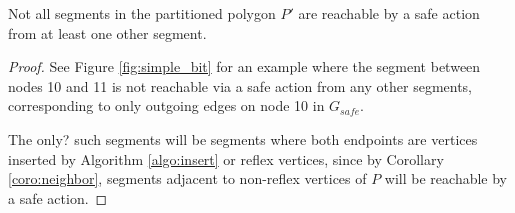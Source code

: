 \documentclass[]{styles/svproc}  %
\begin{document}
\begin{lemma}
Not all segments in the partitioned polygon $P'$ are reachable by a safe action from
at least one other segment.
\end{lemma}

\begin{proof}
See Figure \ref{fig:simple_bit} for an example where the segment between nodes
10 and 11 is not reachable via a safe action from any other segments,
corresponding to only outgoing edges on node 10 in $G_{safe}$.

The {\color{red}only?} such segments will be
segments where both endpoints are vertices inserted by Algorithm
\ref{algo:insert} or reflex vertices, since by Corollary \ref{coro:neighbor},
segments adjacent to non-reflex vertices of $P$ will be reachable by a safe
action.
\end{proof}
\end{document}
